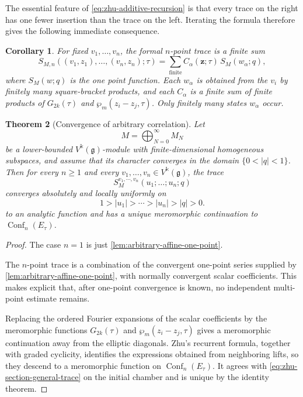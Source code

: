 \documentclass[11pt,a4paper]{amsart}
\numberwithin{equation}{section}
\newtheorem{theorem}{Theorem}[section]
\newtheorem{corollary}[theorem]{Corollary}
\theoremstyle{definition}
\theoremstyle{remark}
\newcommand{\g}{\mathfrak g}
\newcommand{\kk}{\Bbbk}
\newcommand{\zbf}{\boldsymbol z}
\begin{document}
The essential feature of \eqref{eq:zhu-additive-recursion} is that every trace on the right has one fewer insertion than the trace on the left. Iterating the formula therefore gives the following immediate consequence.

\begin{corollary}
\label{cor:zhu-reduction-one-point}
For fixed $v_1,\ldots,v_n$, the formal $n$-point trace is a finite sum
\begin{equation}
 S_{M,n}
 ((v_1,z_1),\ldots,(v_n,z_n);\tau)
 =\sum_{\text{finite}}
 C_\alpha(\zbf;\tau)\,S_M(w_\alpha;q),
 \label{eq:zhu-finite-one-point-reduction}
\end{equation}
where $S_M(w;q)$ is the one point function. Each $w_\alpha$ is obtained from the $v_i$ by finitely many square-bracket products, and each $C_\alpha$ is a finite sum of finite products of $G_{2k}(\tau)$ and $\wp_m(z_i-z_j,\tau)$.  Only finitely many states $w_\alpha$ occur.
\end{corollary}

\begin{theorem}[Convergence of arbitrary correlation]
\label{thm:zhu-recursion-general-convergence}
Let
\begin{equation*}
 M=\bigoplus_{N=0}^{\infty}M_N
\end{equation*}
be a lower-bounded $V^{\kk}(\g)$-module with finite-dimensional homogeneous subspaces, and assume that its character converges in the domain $\{0<|q|<1 \}$.  Then for every $n\geq1$ and every
$v_1,\ldots,v_n\in V^{\kk}(\g)$, the trace
\begin{equation}
 S_M^{v_1,\cdots,v_n}(u_1;\ldots;u_n;q)
 \label{eq:zhu-section-general-trace}
\end{equation}
converges absolutely and locally uniformly on
\begin{equation*}
1>|u_1|>\cdots>|u_n|>|q|>0.
\end{equation*}
to an analytic function and has a unique meromorphic continuation to $\operatorname{Conf}_n(E_\tau)$.  
\end{theorem}

\begin{proof}
 The case $n=1$ is just \cref{lem:arbitrary-affine-one-point}.

The $n$-point trace is a combination of the convergent one-point series supplied by \cref{lem:arbitrary-affine-one-point}, with normally convergent scalar coefficients.  This makes explicit that, after one-point convergence is known, no independent multi-point estimate remains.

Replacing the ordered Fourier expansions of the scalar coefficients by the meromorphic functions $G_{2k}(\tau)$ and $\wp_m(z_i-z_j,\tau)$ gives a meromorphic continuation away from the elliptic diagonals.  Zhu's recurrent formula, together with graded cyclicity, identifies the expressions obtained from neighboring lifts, so they descend to a meromorphic function on
$\operatorname{Conf}_n(E_\tau)$.  It agrees with \eqref{eq:zhu-section-general-trace} on the initial chamber and is unique
by the identity theorem.
\end{proof}
\end{document}
